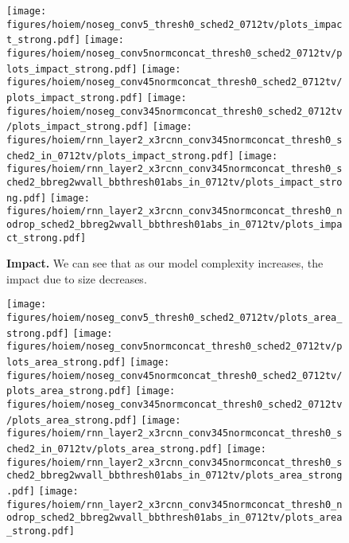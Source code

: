 \documentclass[10pt,twocolumn,letterpaper]{article}
\begin{document}
\begin{figure}[t]
  \begin{center}
   \texttt{[image: figures/hoiem/noseg\_conv5\_thresh0\_sched2\_0712tv/plots\_impact\_strong.pdf]}
   \texttt{[image: figures/hoiem/noseg\_conv5normconcat\_thresh0\_sched2\_0712tv/plots\_impact\_strong.pdf]}
   \texttt{[image: figures/hoiem/noseg\_conv45normconcat\_thresh0\_sched2\_0712tv/plots\_impact\_strong.pdf]}
   \texttt{[image: figures/hoiem/noseg\_conv345normconcat\_thresh0\_sched2\_0712tv/plots\_impact\_strong.pdf]}
   \texttt{[image: figures/hoiem/rnn\_layer2\_x3rcnn\_conv345normconcat\_thresh0\_sched2\_in\_0712tv/plots\_impact\_strong.pdf]}
   \texttt{[image: figures/hoiem/rnn\_layer2\_x3rcnn\_conv345normconcat\_thresh0\_sched2\_bbreg2wvall\_bbthresh01abs\_in\_0712tv/plots\_impact\_strong.pdf]}
   \texttt{[image: figures/hoiem/rnn\_layer2\_x3rcnn\_conv345normconcat\_thresh0\_nodrop\_sched2\_bbreg2wvall\_bbthresh01abs\_in\_0712tv/plots\_impact\_strong.pdf]}
  \end{center}
  \vspace{-12pt}
  \caption{%
    \textbf{Impact.}  We can see that as our model complexity increases, the impact due
    to size decreases.
  }
  \label{fig:hoiem}
\end{figure}\begin{figure}[t]
  \begin{center}
   \texttt{[image: figures/hoiem/noseg\_conv5\_thresh0\_sched2\_0712tv/plots\_area\_strong.pdf]}
   \texttt{[image: figures/hoiem/noseg\_conv5normconcat\_thresh0\_sched2\_0712tv/plots\_area\_strong.pdf]}
   \texttt{[image: figures/hoiem/noseg\_conv45normconcat\_thresh0\_sched2\_0712tv/plots\_area\_strong.pdf]}
   \texttt{[image: figures/hoiem/noseg\_conv345normconcat\_thresh0\_sched2\_0712tv/plots\_area\_strong.pdf]}
   \texttt{[image: figures/hoiem/rnn\_layer2\_x3rcnn\_conv345normconcat\_thresh0\_sched2\_in\_0712tv/plots\_area\_strong.pdf]}
   \texttt{[image: figures/hoiem/rnn\_layer2\_x3rcnn\_conv345normconcat\_thresh0\_sched2\_bbreg2wvall\_bbthresh01abs\_in\_0712tv/plots\_area\_strong.pdf]}
   \texttt{[image: figures/hoiem/rnn\_layer2\_x3rcnn\_conv345normconcat\_thresh0\_nodrop\_sched2\_bbreg2wvall\_bbthresh01abs\_in\_0712tv/plots\_area\_strong.pdf]}
  \end{center}
  \vspace{-12pt}

\end{figure}
\end{document}
